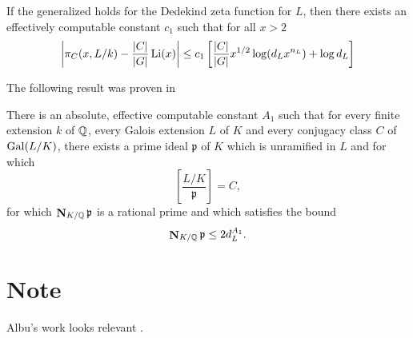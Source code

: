 \begin{proposition}
If the generalized  holds for the Dedekind
zeta function for $L$, then there exists an effectively computable
constant $c_{1}$ such that for all $x>2$
\[
\left|\pi_{C}(x, L/k) - \frac{|C|}{|G|} \mathop{\rm Li}\nolimits(x)\right|
\le c_{1} \left[ \frac{|C|}{|G|} x^{1/2} \log (d_{L} x^{n_{L}}) + \log d_{L}\right]
\]
\end{proposition}

The following result was proven in \cite{Lagarias1979-pp}

\begin{proposition} There is an
absolute, effective computable constant $A_1$ such that for every
finite extension $k$ of $\mathbb{Q}$, every Galois extension $L$ of $K$ and
every conjugacy class $C$ of $\mathop{\rm Gal}\nolimits(L/K)$, there exists a prime ideal
${\mathfrak p}$ of $K$ which is unramified in $L$ and for which 
\[
\left[ \frac{L/K}{\mathfrak p} \right ] = C,
\]
for which $\mathop{\mathbf{N}}\nolimits_{K/\mathbb{Q}} {\mathfrak p}$ is a rational prime and which
satisfies the bound
\[
\mathop{\mathbf{N}}\nolimits_{K/\mathbb{Q}} {\mathfrak p} \le 2 d_L^{A_1}.
\]
\end{proposition}

\section*{Note}

\footnotesize

 Albu's work looks relevant \cite{Albu92}.

\normalsize


